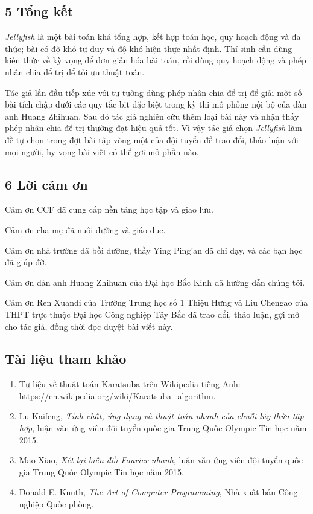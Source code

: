\documentclass[11pt]{article}
\begin{document}
\subsection*{5 Tổng kết}

\emph{Jellyfish} là một bài toán khá tổng hợp, kết hợp toán học, quy hoạch động
và đa thức; bài có độ khó tư duy và độ khó hiện thực nhất định. Thí sinh cần
dùng kiến thức về kỳ vọng để đơn giản hóa bài toán, rồi dùng quy hoạch động và
phép nhân chia để trị để tối ưu thuật toán.

Tác giả lần đầu tiếp xúc với tư tưởng dùng phép nhân chia để trị để giải một số
bài tích chập dưới các quy tắc bit đặc biệt trong kỳ thi mô phỏng nội bộ của
đàn anh Huang Zhihuan. Sau đó tác giả nghiên cứu thêm loại bài này và nhận thấy
phép nhân chia để trị thường đạt hiệu quả tốt. Vì vậy tác giả chọn
\emph{Jellyfish} làm đề tự chọn trong đợt bài tập vòng một của đội tuyển để
trao đổi, thảo luận với mọi người, hy vọng bài viết có thể gợi mở phần nào.

\subsection*{6 Lời cảm ơn}

Cảm ơn CCF đã cung cấp nền tảng học tập và giao lưu.

Cảm ơn cha mẹ đã nuôi dưỡng và giáo dục.

Cảm ơn nhà trường đã bồi dưỡng, thầy Ying Ping'an đã chỉ dạy, và các bạn học đã
giúp đỡ.

Cảm ơn đàn anh Huang Zhihuan của Đại học Bắc Kinh đã hướng dẫn chúng tôi.

Cảm ơn Ren Xuandi của Trường Trung học số 1 Thiệu Hưng và Liu Chengao của THPT
trực thuộc Đại học Công nghiệp Tây Bắc đã trao đổi, thảo luận, gợi mở cho tác
giả, đồng thời đọc duyệt bài viết này.

\subsection*{Tài liệu tham khảo}

\begin{enumerate}
  \item Tư liệu về thuật toán Karatsuba trên Wikipedia tiếng Anh:
  \url{https://en.wikipedia.org/wiki/Karatsuba_algorithm}.
  \item Lu Kaifeng, \emph{Tính chất, ứng dụng và thuật toán nhanh của chuỗi lũy
  thừa tập hợp}, luận văn ứng viên đội tuyển quốc gia Trung Quốc Olympic Tin
  học năm 2015.
  \item Mao Xiao, \emph{Xét lại biến đổi Fourier nhanh}, luận văn ứng viên đội
  tuyển quốc gia Trung Quốc Olympic Tin học năm 2015.
  \item Donald E. Knuth, \emph{The Art of Computer Programming}, Nhà xuất bản
  Công nghiệp Quốc phòng.
\end{enumerate}
\end{document}
